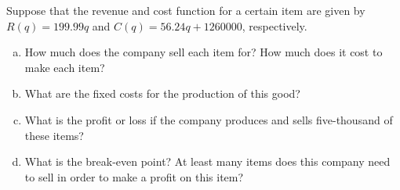 \documentclass[11pt,letterpaper]{article}
\begin{document}

 Suppose that the revenue and cost function for a certain item are given by $R(q)= 199.99q$ and $C(q)= 56.24q + 1260000$, respectively. 
	\begin{enumerate}[(a)]
	\item How much does the company sell each item for? How much does it cost to make each item?
	\item What are the fixed costs for the production of this good?
	\item What is the profit or loss if the company produces and sells five-thousand of these items?
	\item What is the break-even point? At least many items does this company need to sell in order to make a profit on this item?
	\end{enumerate} 
\end{document}
